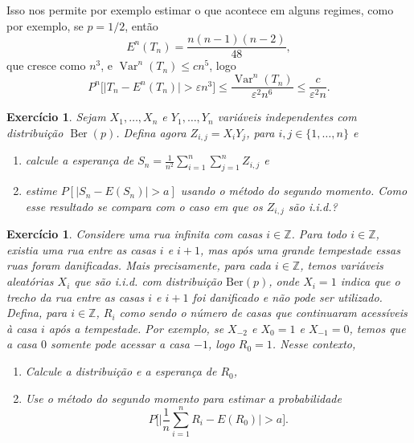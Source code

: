 \documentclass[reqno, draft]{book}
\newcommand*\1{\mathds{1}}
\newtheorem{exercise}[example]{Exercício}
\DeclareMathOperator{\Var}{Var}
\DeclareMathOperator{\Ber}{Ber}
\begin{document}
Isso nos permite por exemplo estimar o que acontece em alguns regimes, como por exemplo, se $p = 1/2$, então
\begin{equation}
  E^n(T_n) = \frac{n(n-1)(n-2)}{48},
\end{equation}
que cresce como $n^3$, e $\Var^n(T_n) \leq c n^5$, logo
\begin{equation}
  P^n\Big[ \Big|T_n - E^n(T_n)\Big| > \varepsilon n^3 \Big] \leq \frac{\Var^n(T_n)}{\varepsilon^2 n^6} \leq \frac{c}{\varepsilon^2 n}.
\end{equation}

\begin{exercise}
  Sejam $X_1, \dots, X_n$ e $Y_1, \dots, Y_n$ variáveis independentes com distribuição $\Ber(p)$.
  Defina agora $Z_{i,j} = X_i Y_j$, para $i, j \in \{1, \dots, n\}$ e
  \begin{enumerate}[\quad a)]
  \item calcule a esperança de $S_n = \tfrac{1}{n^2} \sum_{i=1}^n \sum_{j=1}^n Z_{i,j}$ e
  \item estime $P[|S_n - E(S_n)| > a]$ usando o método do segundo momento. Como esse resultado se compara com o caso em que os $Z_{i,j}$ são i.i.d.?
  \end{enumerate}
\end{exercise}

\begin{exercise}
  \label{x:casas_tempestade}
  Considere uma rua infinita com casas $i \in \mathbb{Z}$.
  Para todo $i \in \mathbb{Z}$, existia uma rua entre as casas $i$ e $i+1$, mas após uma grande tempestade essas ruas foram danificadas.
  Mais precisamente, para cada $i \in \mathbb{Z}$, temos variáveis aleatórias $X_i$ que são i.i.d. com distribuição $\text{Ber}(p)$, onde $X_i = 1$ indica que o trecho da rua entre as casas $i$ e $i + 1$ foi danificado e não pode ser utilizado.
  Defina, para $i \in \mathbb{Z}$, $R_i$ como sendo o número de casas que continuaram acessíveis à casa $i$ após a tempestade.
  Por exemplo, se $X_{-2}$ e $X_0 = 1$ e $X_{-1} = 0$, temos que a casa $0$ somente pode acessar a casa $-1$, logo $R_0 = 1$.
  Nesse contexto,
  \begin{enumerate}[\quad a)]
  \item Calcule a distribuição e a esperança de $R_0$,
  \item Use o método do segundo momento para estimar a probabilidade
    \begin{equation}
      P \Big[ \Big| \frac{1}{n} \sum_{i=1}^n R_i - E(R_0) \Big| > a \Big].
    \end{equation}
  \end{enumerate}
\end{exercise}
\end{document}
